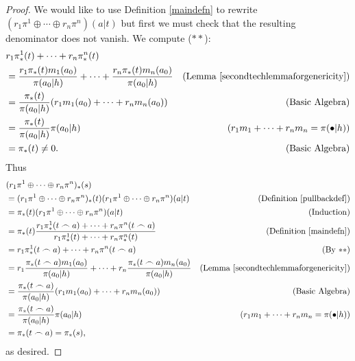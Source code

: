 \documentclass[runningheads]{llncs}
\begin{document}
\begin{proof}
    We would like to use Definition \ref{maindefn} to rewrite
    $(r_1\pi^1\oplus\cdots\oplus r_n\pi^n)(a|t)$ but first we must
    check that the resulting denominator does not vanish. We compute ($**$):
    \begin{align*}
        &{} r_1\pi^1_*(t) + \cdots + r_n\pi^n_*(t)\\
            &= \frac{r_1\pi_*(t)m_1(a_0)}{\pi(a_0|h)}
                + \cdots +
                \frac{r_n\pi_*(t)m_n(a_0)}{\pi(a_0|h)}
                    &\mbox{(Lemma \ref{secondtechlemmaforgenericity})}\\
            &= \frac{\pi_*(t)}{\pi(a_0|h)}
                (r_1m_1(a_0) + \cdots + r_nm_n(a_0))
                    &\mbox{(Basic Algebra)}\\
            &= \frac{\pi_*(t)}{\pi(a_0|h)}\pi(a_0|h)
                    &\mbox{($r_1m_1+\cdots+r_nm_n=\pi(\bullet|h)$)}\\
            &= \pi_*(t)\not=0.
                    &\mbox{(Basic Algebra)}
    \end{align*}
    Thus
    \begin{align*}
        &{} (r_1\pi^1\oplus\cdots\oplus r_n\pi^n)_*(s)\\
            &= (r_1\pi^1\oplus\cdots\oplus r_n\pi^n)_*(t)
                (r_1\pi^1\oplus\cdots\oplus r_n\pi^n)(a|t)
                    &\mbox{(Definition \ref{pullbackdef})}\\
            &= \pi_*(t)(r_1\pi^1\oplus\cdots\oplus r_n\pi^n)(a|t)
                    &\mbox{(Induction)}\\
            &= \pi_*(t)\frac{r_1\pi^1_*(t\frown a)+\cdots+r_n\pi^n(t\frown a)}
                {r_1\pi^1_*(t)+\cdots+r_n\pi^n_*(t)}
                    &\mbox{(Definition \ref{maindefn})}\\
            &= r_1\pi^1_*(t\frown a)+\cdots+r_n\pi^n(t\frown a)
                    &\mbox{(By $**$)}\\
            &= r_1\frac{\pi_*(t\frown a)m_1(a_0)}{\pi(a_0|h)}
                +\cdots+r_n\frac{\pi_*(t\frown a)m_n(a_0)}{\pi(a_0|h)}
                    &\mbox{(Lemma \ref{secondtechlemmaforgenericity})}\\
            &= \frac{\pi_*(t\frown a)}{\pi(a_0|h)}(r_1m_1(a_0)+\cdots+r_nm_n(a_0))
                    &\mbox{(Basic Algebra)}\\
            &= \frac{\pi_*(t\frown a)}{\pi(a_0|h)}\pi(a_0|h)
                    &\mbox{($r_1m_1+\cdots+r_nm_n=\pi(\bullet|h)$)}\\
            &= \pi_*(t\frown a) = \pi_*(s),
    \end{align*}
    as desired.


\end{proof}
\end{document}

